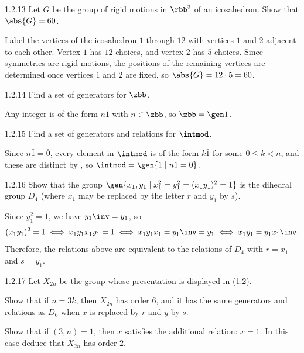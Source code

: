 \begin{exercise}{1.2.13}
    Let $G$ be the group of rigid motions in $\rbb^3$ of an icosahedron.
	Show that $\abs{G} = 60$.
\end{exercise}

\begin{sol}
    Label the vertices of the icosahedron $1$ through $12$ with vertices $1$ and $2$ adjacent to each other.
    Vertex $1$ has $12$ choices, and vertex $2$ has $5$ choices.
    Since symmetries are rigid motions, the positions of the remaining vertices are determined once vertices $1$ and $2$ are fixed, so $\abs{G} = 12 \cdot 5 = 60$.
\end{sol}

\begin{exercise}{1.2.14}
    Find a set of generators for $\zbb$.
\end{exercise}

\begin{sol}
    Any integer is of the form $n1$ with $n \in \zbb$, so $\zbb = \gen 1$.
\end{sol}

\begin{exercise}{1.2.15}
    Find a set of generators and relations for $\intmod$.
\end{exercise}

\begin{sol}
    Since $n \bar 1 = \bar 0$, every element in $\intmod$ is of the form $k \bar 1$ for some $0 \leq k < n$, and these are distinct by , so $\intmod = \gen{\bar 1 \mid n \bar 1 = \bar 0}$.
\end{sol}

\begin{exercise}{1.2.16}
    Show that the group $\gen{x_1, y_1 \mid x_1^2 = y_1^2 = (x_1 y_1)^2 = 1}$ is the dihedral group $D_4$ (where $x_1$ may be replaced by the letter $r$ and $y_1$ by $s$).
\end{exercise}

\begin{sol}
    Since $y_1^2 = 1$, we have $y_1\inv = y_1$, so
    \[
        (x_1 y_1)^2 = 1 \iff x_1 y_1 x_1 y_1 = 1 \iff x_1 y_1 x_1 = y_1\inv = y_1 \iff x_1 y_1 = y_1 x_1\inv.
    \]
    Therefore, the relations above are equivalent to the relations of $D_4$ with $r = x_1$ and $s = y_1$.
\end{sol}

\begin{exercise}{1.2.17}
    Let $X_{2n}$ be the group whose presentation is displayed in (1.2).
    \begin{subexercises}
        \item Show that if $n = 3k$, then $X_{2n}$ has order $6$, and it has the same generators and relations as $D_6$ when $x$ is replaced by $r$ and $y$ by $s$.
        \item Show that if $(3, n) = 1$, then $x$ satisfies the additional relation: $x = 1$.
	    In this case deduce that $X_{2n}$ has order $2$.
    \end{subexercises}
\end{exercise}

